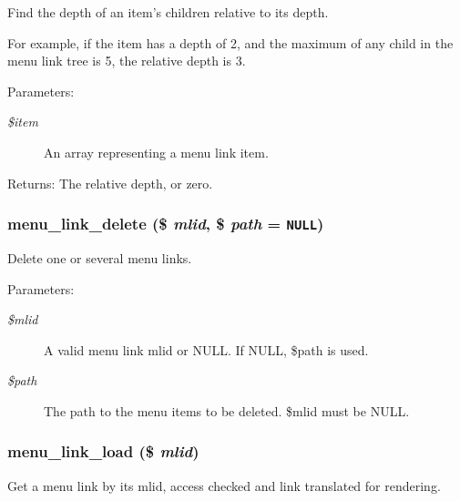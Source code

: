 Find the depth of an item's children relative to its depth.

For example, if the item has a depth of 2, and the maximum of any child in the menu link tree is 5, the relative depth is 3.

\begin{Desc}
\item[Parameters:]
\begin{description}
\item[{\em \$item}]An array representing a menu link item. \end{description}
\end{Desc}
\begin{Desc}
\item[Returns:]The relative depth, or zero. \end{Desc}
\hypertarget{group__menu_gcb2dddc8ca84476f38a90f4487156b12}{
\subsubsection[{menu\_\-link\_\-delete}]{\setlength{\rightskip}{0pt plus 5cm}menu\_\-link\_\-delete (\$ {\em mlid}, \/  \$ {\em path} = {\tt NULL})}}
\label{group__menu_gcb2dddc8ca84476f38a90f4487156b12}


Delete one or several menu links.

\begin{Desc}
\item[Parameters:]
\begin{description}
\item[{\em \$mlid}]A valid menu link mlid or NULL. If NULL, \$path is used. \item[{\em \$path}]The path to the menu items to be deleted. \$mlid must be NULL. \end{description}
\end{Desc}
\hypertarget{group__menu_gc2b338fa3a449c826661aade7a7d486e}{
\subsubsection[{menu\_\-link\_\-load}]{\setlength{\rightskip}{0pt plus 5cm}menu\_\-link\_\-load (\$ {\em mlid})}}
\label{group__menu_gc2b338fa3a449c826661aade7a7d486e}


Get a menu link by its mlid, access checked and link translated for rendering.

